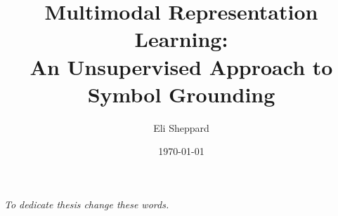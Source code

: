 \documentclass[titlepage,shield]{hwthesis}
\let\oldapp\appendix
\renewcommand{\appendix}{\oldapp\renewcommand*{\chaptername}{\appendixname}}
\begin{document}

\title{Multimodal Representation Learning: \\ An Unsupervised Approach to Symbol Grounding}


\date{\today} %

\author{Eli Sheppard} %


\maketitle
{}
\ifx\submissiontype\firstsub%
\mbox{}
\fi%

\begin{abstract}

\end{abstract}
\ifx\submissiontype\firstsub%
\mbox{}
\fi%

\clearpage
\vspace*{12cm}
\hfil
\hspace{6.5cm}
\textit{To dedicate thesis change these words.}
\clearpage
\ifx\submissiontype\firstsub%
\mbox{}
\clearpage
\fi%

\begin{acknowledgements}

\end{acknowledgements}
\ifx\submissiontype\firstsub%
\mbox{}
\fi%

\ifx\submissiontype\arxivsub%
\relax
\else%

\ifx\submissiontype\firstsub%
\mbox{}
\fi%
\fi%

\clearpage
\setcounter{page}{1}

\tableofcontents


\clearpage
{}


 
 

 
 

 


\appendix 







\clearpage
\end{document}
